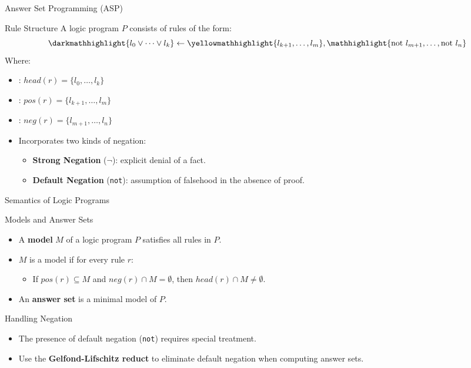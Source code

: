 \begin{frame}{Answer Set Programming (ASP)}
    \begin{alertblock}{Rule Structure}
        A logic program \(P\) consists of rules of the form:
        \[
            \darkmathhighlight{l_0 \lor \dots \lor l_k} \leftarrow \yellowmathhighlight{l_{k+1}, \dots, l_m}, \mathhighlight{\text{not }l_{m+1}, \dots, \text{not }l_n}
        \]
        Where:
        \begin{itemize}
            \item {}: \(head(r) = \{l_0, \dots, l_k\}\)
            \item {}: \(pos(r) = \{l_{k+1}, \dots, l_m\}\)
            \item {}: \(neg(r) = \{l_{m+1}, \dots, l_n\}\)
        \end{itemize}
    \end{alertblock}
    \begin{itemize}
        \item Incorporates two kinds of negation:
              \begin{itemize}
                  \item \textbf{Strong Negation} ($\neg$): explicit denial of a fact.
                  \item \textbf{Default Negation} (\texttt{not}): assumption of falsehood in the absence of proof.
              \end{itemize}
    \end{itemize}
\end{frame}

\begin{frame}{Semantics of Logic Programs}
    \begin{block}{Models and Answer Sets}
        \begin{itemize}
            \item A \textbf{model} \(M\) of a logic program \(P\) satisfies all rules in \(P\).
            \item \(M\) is a model if for every rule \(r\):
                  \begin{itemize}
                      \item If \(pos(r) \subseteq M\) and \(neg(r) \cap M = \emptyset\), then \(head(r) \cap M \neq \emptyset\).
                  \end{itemize}
            \item An \textbf{answer set} is a minimal model of \(P\).
        \end{itemize}
    \end{block}
    \begin{block}{Handling Negation}
        \begin{itemize}
            \item The presence of default negation (\texttt{not}) requires special treatment.
            \item Use the \textbf{Gelfond-Lifschitz reduct} to eliminate default negation when computing answer sets.
        \end{itemize}
    \end{block}
\end{frame}

